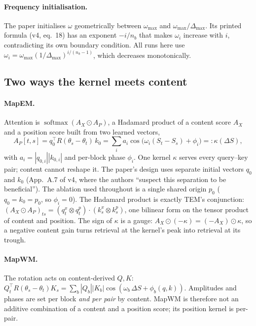 \documentclass[10pt]{article}
\newcommand{\nb}{n_b}
\DeclareMathOperator{\softmax}{softmax}
\begin{document}
\paragraph{Frequency initialisation.} The paper initialises $\omega$ geometrically between
$\omega_{\max}$ and $\omega_{\max}/\Delta_{\max}$. Its printed formula (v4, eq.~18) has an exponent
$-i/\nb$ that makes $\omega_i$ increase with $i$, contradicting its own boundary condition. All runs
here use $\omega_i=\omega_{\max}(1/\Delta_{\max})^{i/(\nb-1)}$, which decreases monotonically.

\subsection{Two ways the kernel meets content}

\paragraph{MapEM.} Attention is $\softmax(A_X\odot A_P)$, a Hadamard product of a content score
$A_X$ and a position score built from two learned vectors,
\begin{equation}
A_P[t,s] = q_0^\top R(\theta_s-\theta_t)\, k_0 = \sum_i a_i \cos\!\big(\omega_i (S_t-S_s) + \phi_i\big) =: \kappa(\Delta S),
\label{eq:kernel}
\end{equation}
with $a_i=|q_{0,i}||k_{0,i}|$ and per-block phase $\phi_i$. One kernel $\kappa$ serves every
query--key pair; content cannot reshape it. The paper's design uses separate initial vectors $q_0$
and $k_0$ (App.~A.7 of v4, where the authors ``suspect this separation to be beneficial''). The
ablation used throughout is a single shared origin $p_0$ ($q_0=k_0=p_0$, so $\phi_i=0$). The Hadamard
product is exactly TEM's conjunction: $(A_X\odot A_P)_{ts} = (q^x_t\otimes q^p_t)\cdot(k^x_s\otimes
k^p_s)$, one bilinear form on the tensor product of content and position. The sign of $\kappa$ is a
gauge: $A_X\odot(-\kappa) = (-A_X)\odot\kappa$, so a negative content gain turns retrieval at the
kernel's peak into retrieval at its trough.

\paragraph{MapWM.} The rotation acts on content-derived $Q,K$:
$Q_t^\top R(\theta_s-\theta_t)K_s = \sum_b |Q_b||K_b|\cos(\omega_b\,\Delta S + \phi_b(q,k))$.
Amplitudes and phases are set per block \emph{and per pair} by content. MapWM is therefore not an
additive combination of a content and a position score; its position kernel is per-pair.
\end{document}
